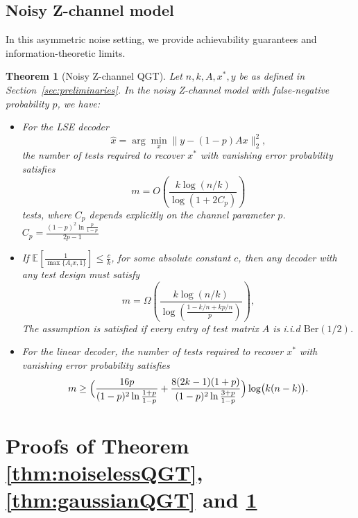 \documentclass{article}
\newtheorem{theorem}{Theorem}
\newcommand{\E}{\mathbb{E}}
\newcommand{\Ber}{\mathrm{Ber}}
\begin{document}
\subsection{Noisy Z-channel model}
In this asymmetric noise setting, we provide achievability guarantees and information-theoretic limits.
\begin{theorem}[Noisy Z-channel QGT]\label{thm:ZchannelQGT}
Let $n,k,A,x^*,y$ be as defined in Section~\ref{sec:preliminaries}. In the noisy Z-channel model with false-negative probability $p$, we have: 
\begin{itemize}
  \item For the LSE decoder
    \[
    \widehat{x} = \arg\min_x \|y - (1-p)A x\|_2^2,
    \] 
    the number of tests required to recover $x^*$ with vanishing error probability satisfies
  \[
  m = O\!\left(\frac{k\log(n/k)}{\log(1 + 2C_p)}\right)
  \]
  tests, where $C_p$ depends explicitly on the channel parameter $p$.
  $C_p=\frac{(1-p)^2\ln\frac{p}{1-p}}{2p-1}$
  \item If $\E \!\left[\frac{1}{\max\{A_ix, 1\}} \right]\leq \frac{c}{k}$, for some absolute constant $c$, then any decoder with any test design must satisfy
  \[
  m = \Omega\!\left(\frac{k\log(n/k)}{\log(\frac{1-k/n+kp/n}{p})}\right),
  \]
  The assumption is satisfied if every entry of test matrix $A$ is i.i.d $\Ber(1/2)$.
  \item For the linear decoder,
  the number of tests required to recover $x^*$ with vanishing error probability satisfies
    \[
    m\ge \Bigl(
    \frac{16p}{(1-p)^2 \ln\frac{1+p}{1-p}}
    +
    \frac{8(2k-1)(1+p)}{(1-p)^2 \ln\frac{3+p}{1-p}}\Bigr) \log\bigl(k(n-k)\bigr).
    \]

\end{itemize}
\end{theorem}

\section{Proofs of Theorem \ref{thm:noiselessQGT}, \ref{thm:gaussianQGT} and \ref{thm:ZchannelQGT}}\label{sec:proofs}
\end{document}
